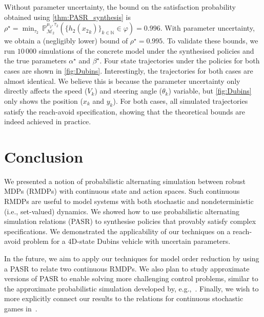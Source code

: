 \documentclass[letterpaper, 10 pt, conference]{ieeeconf}  %
\newcommand*{\policy}{\ensuremath{\mu}}
\newcommand*{\labelfunc}{\ensuremath{h}}
\newcommand*{\rmdp}{{\ensuremath{\mathcal{M}}}}
\newcommand*{\adversary}{\ensuremath{\tau}}
\newcommand*{\NN}{\mathbb{N}}
\newcommand*{\Prob}{\mathbb{P}}
\begin{document}
Without parameter uncertainty, the bound on the satisfaction probability obtained using \cref{thm:PASR_synthesis} is $\rho^\star = \min_{\adversary_2} \,\Prob_{\rmdp_2}^{\policy_2, \adversary_2}\left( \{\labelfunc_2({x_2}_k)\}_{k \in \NN} \in \varphi \right) = 0.996$.
With parameter uncertainty, we obtain a (negligibly lower) bound of $\rho^\star = 0.995$.
To validate these bounds, we run $10\,000$ simulations of the concrete model under the synthesised policies and the true parameters $\alpha^\star$ and $\beta^\star$.
Four state trajectories under the policies for both cases are shown in \cref{fig:Dubins}.
Interestingly, the trajectories for both cases are almost identical.
We believe this is because the parameter uncertainty only directly affects the speed ($V_k$) and steering angle ($\theta_k$) variable, but \cref{fig:Dubins} only shows the position ($x_k$ and $y_k$).
For both cases, all simulated trajectories satisfy the reach-avoid specification, showing that the theoretical bounds are indeed achieved in practice.

\section{Conclusion}
We presented a notion of probabilistic alternating simulation between robust MDPs (RMDPs) with continuous state and action spaces.
Such continuous RMDPs are useful to model systems with both stochastic and nondeterministic (i.e., set-valued) dynamics.
We showed how to use probabilistic alternating simulation relations (PASR) to synthesise policies that provably satisfy complex specifications.
We demonstrated the applicability of our techniques on a reach-avoid problem for a 4D-state Dubins vehicle with uncertain parameters.

In the future, we aim to apply our techniques for model order reduction by using a PASR to relate two continuous RMDPs.
We also plan to study approximate versions of PASR to enable solving more challenging control problems, similar to the approximate probabilistic simulation developed by, e.g.,~\cite{DBLP:journals/siamco/HaesaertSA17}.
Finally, we wish to more explicitly connect our results to the relations for continuous stochastic games in~\cite{DBLP:journals/automatica/ZhongLZC23}.



\end{document}
